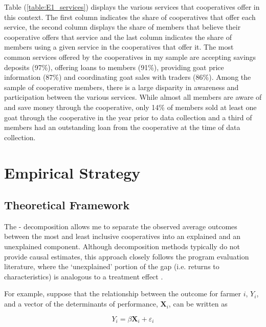 \documentclass[11pt]{article}
\begin{document}
Table (\ref{table:E1_services}) displays the various services that cooperatives offer in this context. The first column indicates the share of cooperatives that offer each service, the second column displays the share of members that believe their cooperative offers that service and the last column indicates the share of members using a given service in the cooperatives that offer it. The most common services offered by the cooperatives in my sample are accepting savings deposits (97\%), offering loans to members (91\%), providing goat price information (87\%) and coordinating goat sales with traders (86\%). Among the sample of cooperative members, there is a large disparity in awareness and participation between the various services. While almost all members are aware of and save money through the cooperative, only 14\% of members sold at least one goat through the cooperative in the year prior to data collection and a third of members had an outstanding loan from the cooperative at the time of data collection.


\section{Empirical Strategy} \label{sec:E1_emp}

\subsection{Theoretical Framework} \label{sec:E1_theory}

The \citet{oaxaca_male-female_1973}-\citet{blinder_wage_1973} decomposition allows me to separate the observed average outcomes between the most and least inclusive cooperatives into an explained and an unexplained component. Although decomposition methods typically do not provide causal estimates, this approach closely follows the program evaluation literature, where the `unexplained' portion of the gap (i.e. returns to characteristics) is analogous to a treatment effect \citep{n_fortin_notitle_2011}.

For example, suppose that the relationship between the outcome for farmer $i$, $Y_i$, and a vector of the determinants of performance, $\mathbf{X}_i$, can be written as

\begin{equation} \label{eq:E1_1}
    Y_i = \beta \mathbf{X}_i + \varepsilon_i
\end{equation}  
\end{document}
